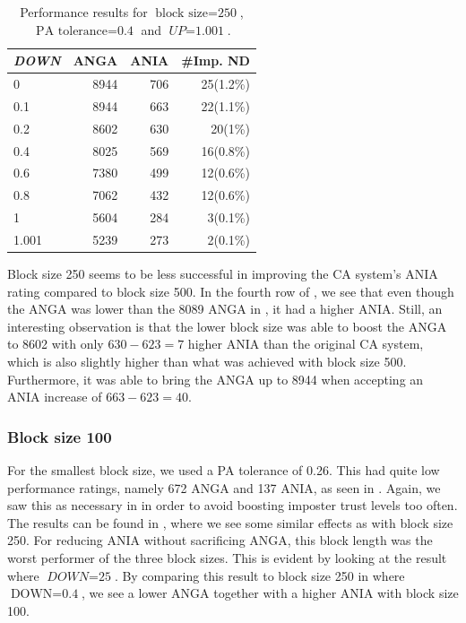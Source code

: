 \begin{table}[ht]
\centering
\begin{tabular}{lrrr}
\hline
\textit{DOWN} & ANGA  & ANIA & \#Imp. ND \\ \hline
0     & 8944 & 706 & 25(1.2\%) \\
0.1   & 8944 & 663 & 22(1.1\%) \\
0.2   & 8602 & 630 & 20(1\%)   \\
0.4   & 8025 & 569 & 16(0.8\%) \\
0.6   & 7380 & 499 & 12(0.6\%) \\
0.8   & 7062 & 432 & 12(0.6\%) \\
1     & 5604 & 284 & 3(0.1\%)  \\
1.001 & 5239 & 273 & 2(0.1\%) 
\end{tabular}
\caption{Performance results for $\text{block size} = \text{250}$, $\text{PA tolerance} = \text{0.4}$ and $\textit{UP} = \text{1.001}$.}
\label{tab:decision-level-BL250}
\end{table}

Block size 250 seems to be less successful in improving the CA system's ANIA rating compared to block size 500. 
In the fourth row of , we see that even though the ANGA was lower than the 8089 ANGA in , it had a higher ANIA.
Still, an interesting observation is that the lower block size was able to boost the ANGA to 8602 with only $\text{630}-\text{623} = \text{7}$ higher ANIA than the original CA system, which is also slightly higher than what was achieved with block size 500.
Furthermore, it was able to bring the ANGA up to 8944 when accepting an ANIA increase of $\text{663}-\text{623}=\text{40}$.

\subsubsection{Block size 100}
For the smallest block size, we used a PA tolerance of 0.26.
This had quite low performance ratings, namely 672 ANGA and 137 ANIA, as seen in .
Again, we saw this as necessary in in order to avoid boosting imposter trust levels too often.
The results can be found in , where we see some similar effects as with block size 250.
For reducing ANIA without sacrificing ANGA, this block length was the worst performer of the three block sizes.
This is evident by looking at the result where $\textit{DOWN} = \text{25}$.
By comparing this result to block size 250 in  where $\text{DOWN} = \text{0.4}$, we see a lower ANGA together with a higher ANIA with block size 100.

